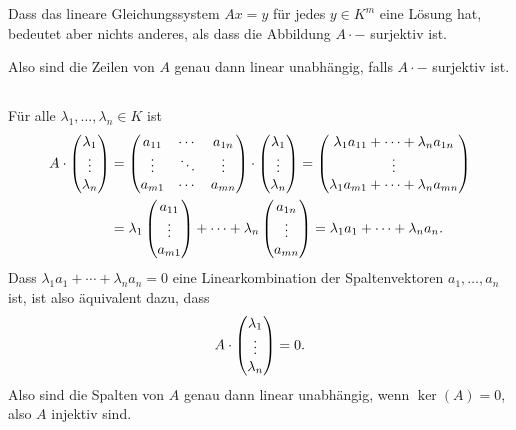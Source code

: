 \documentclass[a4paper,10pt]{scrartcl}
\begin{document}
Dass das lineare Gleichungssystem $Ax = y$ für jedes $y \in K^m$ eine Lösung hat, bedeutet aber nichts anderes, als dass die Abbildung $A \cdot -$ surjektiv ist.

Also sind die Zeilen von $A$ genau dann linear unabhängig, falls $A \cdot -$ surjektiv ist.



\subsection{}
Für alle $\lambda_1, \dotsc, \lambda_n \in K$ ist
\begin{align*}
 A \cdot \begin{pmatrix} \lambda_1 \\ \vdots \\ \lambda_n \end{pmatrix}
 &=
 \begin{pmatrix}
  a_{11} & \cdots & a_{1n} \\
  \vdots & \ddots & \vdots \\
  a_{m1} & \cdots & a_{mn}
 \end{pmatrix}
 \cdot
 \begin{pmatrix} \lambda_1 \\ \vdots \\ \lambda_n \end{pmatrix}
 =
 \begin{pmatrix} \lambda_1 a_{11} + \dotsb + \lambda_n a_{1n} \\ \vdots \\ \lambda_1 a_{m1} + \dotsb + \lambda_n a_{mn} \end{pmatrix} \\
 &= \lambda_1 \begin{pmatrix} a_{11} \\ \vdots \\ a_{m1} \end{pmatrix} + \dotsb + \lambda_n \begin{pmatrix} a_{1n} \\ \vdots \\ a_{mn} \end{pmatrix}
 = \lambda_1 a_1 + \dotsb + \lambda_n a_n.
\end{align*}
Dass $\lambda_1 a_1 + \dotsb + \lambda_n a_n = 0$ eine Linearkombination der Spaltenvektoren $a_1, \dotsc, a_n$ ist, ist also äquivalent dazu, dass
\[
 A \cdot \begin{pmatrix} \lambda_1 \\ \vdots \\ \lambda_n \end{pmatrix} = 0.
\]
Also sind die Spalten von $A$ genau dann linear unabhängig, wenn $\ker(A) = 0$, also $A$ injektiv sind.
\end{document}
